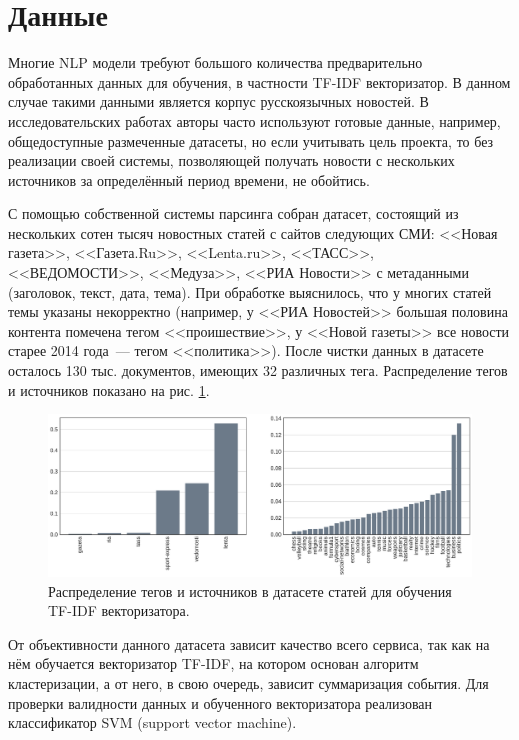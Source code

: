 \documentclass[a4paper, 14pt]{extarticle}
\begin{document}
\section{Данные}
Многие NLP модели требуют большого количества предварительно обработанных данных для обучения, в частности TF-IDF векторизатор. В данном случае такими данными является корпус русскоязычных новостей. В исследовательских работах авторы часто используют готовые данные, например, общедоступные размеченные датасеты, но если учитывать цель проекта, то без реализации своей системы, позволяющей получать новости с нескольких источников за определённый период времени, не обойтись.

С помощью собственной системы парсинга собран датасет, состоящий из нескольких сотен тысяч новостных статей с сайтов следующих СМИ: <<Новая газета>>, <<Газета.Ru>>, <<Lenta.ru>>, <<ТАСС>>, <<ВЕДОМОСТИ>>, <<Медуза>>, <<РИА Новости>> с метаданными (заголовок, текст, дата, тема). При обработке выяснилось, что у многих статей темы указаны некорректно (например, у <<РИА Новостей>> большая половина контента помечена тегом <<проишествие>>, у <<Новой газеты>> все новости старее 2014 года~--- тегом <<политика>>). После чистки данных в датасете осталось 130 тыс. документов, имеющих 32 различных тега. Распределение тегов и источников показано на рис. \ref{datadistr}.

\begin{figure}[h!]
	\centering
	\includegraphics[scale=0.35]{datadistr}
	\caption{Распределение тегов и источников в датасете статей для обучения TF-IDF векторизатора.}
	\label{datadistr}
\end{figure}

От объективности данного датасета зависит качество всего сервиса, так как на нём обучается векторизатор TF-IDF, на котором основан алгоритм кластеризации, а от него, в свою очередь, зависит суммаризация события. Для проверки валидности данных и обученного векторизатора реализован классификатор SVM (support vector machine).
\end{document}
